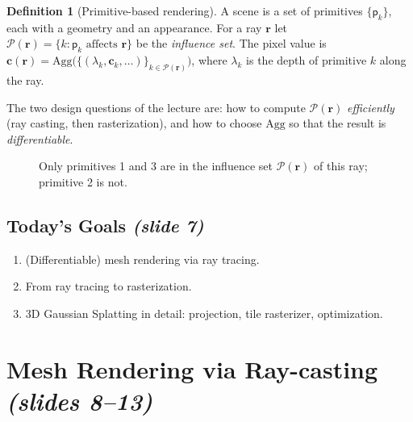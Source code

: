 \documentclass[11pt,a4paper]{article}
\newcommand{\sr}[1]{\texorpdfstring{\emph{(#1)}}{(#1)}}
\newcommand{\eye}[2]{\begin{scope}[shift={(#1,#2)}]
  \draw[thick,fill=white] (0,0) to[bend left=45] (0.7,0) to[bend left=45] (0,0);
  \fill[blue!45] (0.35,0) circle (0.09);\end{scope}}
\newcommand{\blob}[6]{\begin{scope}[shift={(#1,#2)},rotate=#5]
  \shade[inner color=#6,outer color=#6!4] (0,0) ellipse (#3 and #4);\end{scope}}
\theoremstyle{definition}
\newtheorem{definition}{Definition}[section]
\theoremstyle{plain}
\theoremstyle{remark}
\begin{document}
\begin{definition}[Primitive-based rendering]
A scene is a set of primitives $\{\mathsf p_k\}$, each with a geometry and an appearance. For a ray $\bm r$ let $\mathcal P(\bm r)=\{k:\mathsf p_k\text{ affects }\bm r\}$ be the \emph{influence set}. The pixel value is $\bm c(\bm r)=\mathrm{Agg}\big(\{(\lambda_k,\bm c_k,\dots)\}_{k\in\mathcal P(\bm r)}\big)$, where $\lambda_k$ is the depth of primitive $k$ along the ray.
\end{definition}

\begin{intuition}
The two design questions of the lecture are: how to compute $\mathcal P(\bm r)$ \emph{efficiently} (ray casting, then rasterization), and how to choose $\mathrm{Agg}$ so that the result is \emph{differentiable}.
\end{intuition}

\begin{figure}[htbp]
\centering
{}
\caption{Only primitives 1 and 3 are in the influence set $\mathcal P(\bm r)$ of this ray; primitive 2 is not.}
\end{figure}

\subsection{Today's Goals \sr{slide 7}}
\begin{enumerate}[nosep]
\item (Differentiable) mesh rendering via ray tracing.
\item From ray tracing to rasterization.
\item 3D Gaussian Splatting in detail: projection, tile rasterizer, optimization.
\end{enumerate}

\section{Mesh Rendering via Ray-casting \sr{slides 8--13}}
\end{document}
